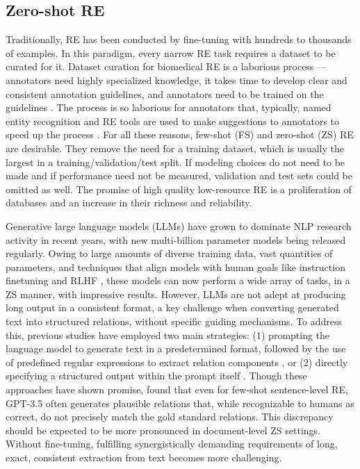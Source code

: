 \documentclass[11pt]{article}
\begin{document}
\subsection{Zero-shot RE}
Traditionally, RE has been conducted by fine-tuning with hundreds to thousands of examples. In this paradigm, every narrow RE task requires a dataset to be curated for it. Dataset curation for biomedical RE is a laborious process --- annotators need highly specialized knowledge, it takes time to develop clear and consistent annotation guidelines, and annotators need to be trained on the guidelines \cite{luo2022biored, li2016biocreative}. The process is so laborious for annotators that, typically, named entity recognition and RE tools are used to make suggestions to annotators to speed up the process \cite{luo2022biored, li2016biocreative}. For all these reasons, few-shot (FS) and zero-shot (ZS) RE are desirable. They remove the need for a training dataset, which is usually the largest in a training/validation/test split. If modeling choices do not need to be made and if performance need not be measured, validation and test sets could be omitted as well.
The promise of high quality low-resource RE is a proliferation of databases and an increase in their richness and reliability.  

Generative large language models (LLMs) have grown to dominate NLP research activity in recent years, with new multi-billion parameter models being released regularly. Owing to large amounts of diverse training data, vast quantities of parameters, and techniques that align models with human goals like instruction finetuning \cite{instruct-gpt, wei-ift, sanh-ift} and RLHF \cite{ouyang2022training}, these models can now perform a wide array of tasks, in a ZS manner, with impressive results.  
However, LLMs are not adept at producing long output in a consistent format, a key challenge when converting generated text into structured relations, without specific guiding mechanisms. To address this, previous studies have employed two main strategies: (1) prompting the language model to generate text in a predetermined format, followed by the use of predefined regular expressions to extract relation components \cite{luo2022biogpt, gupta2025comparison}, or (2) directly specifying a structured output within the prompt itself \cite{wadhwa-etal-2023-revisiting}. Though these approaches have shown promise,  \citet{wadhwa-etal-2023-revisiting} found that even for few-shot sentence-level RE,  GPT-3.5 often generates plausible relations that, while recognizable to humans as correct, do not precisely match the gold standard relations. This discrepancy should be expected to be more pronounced in document-level ZS settings. Without fine-tuning, fulfilling synergistically demanding requirements of long, exact, consistent extraction from text becomes more challenging. 
\end{document}
